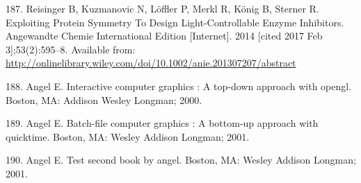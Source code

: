 \documentclass[12pt,twoside]{reedthesis}
\begin{document}
  \hypertarget{ref-reisinger_exploiting_2014}{}
  187. Reisinger B, Kuzmanovic N, Löffler P, Merkl R, König B, Sterner R.
  Exploiting Protein Symmetry To Design Light-Controllable Enzyme
  Inhibitors. Angewandte Chemie International Edition {[}Internet{]}. 2014
  {[}cited 2017 Feb 3{]};53(2):595--8. Available from:
  \url{http://onlinelibrary.wiley.com/doi/10.1002/anie.201307207/abstract}
  
  \hypertarget{ref-angel2000}{}
  188. Angel E. Interactive computer graphics : A top-down approach with
  opengl. Boston, MA: Addison Wesley Longman; 2000.
  
  \hypertarget{ref-angel2001}{}
  189. Angel E. Batch-file computer graphics : A bottom-up approach with
  quicktime. Boston, MA: Wesley Addison Longman; 2001.
  
  \hypertarget{ref-angel2002a}{}
  190. Angel E. Test second book by angel. Boston, MA: Wesley Addison
  Longman; 2001.


\end{document}
